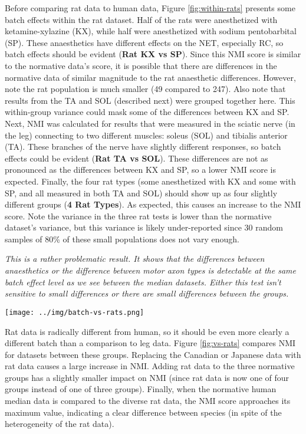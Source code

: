 \documentclass[12pt]{article}
\begin{document}
Before comparing rat data to human data, Figure \ref{fig:within-rats} presents some batch effects within the rat dataset. Half of the rats were anesthetized with ketamine-xylazine (KX), while half were anesthetized with sodium pentobarbital (SP). These anaesthetics have different effects on the NET, especially RC, so batch effects should be evident (\textbf{Rat KX vs SP}). Since this NMI score is similar to the normative data's score, it is possible that there are differences in the normative data of similar magnitude to the rat anaesthetic differences. However, note the rat population is much smaller (49 compared to 247). Also note that results from the TA and SOL (described next) were grouped together here. This within-group variance could mask some of the differences between KX and SP.
Next, NMI was calculated for results that were measured in the sciatic nerve (in the leg) connecting to two different muscles: soleus (SOL) and tibialis anterior (TA). These branches of the nerve have slightly different responses, so batch effects could be evident (\textbf{Rat TA vs SOL}). These differences are not as pronounced as the differences between KX and SP, so a lower NMI score is expected.
Finally, the four rat types (some anesthetized with KX and some with SP, and all measured in both TA and SOL) should show up as four slightly different groups (\textbf{4 Rat Types}). As expected, this causes an increase to the NMI score.
Note the variance in the three rat tests is lower than the normative dataset's variance, but this variance is likely under-reported since 30 random samples of 80\% of these small populations does not vary enough.

\emph{This is a rather problematic result. It shows that the differences between anaesthetics or the difference between motor axon types is detectable at the same batch effect level as we see between the median datasets. Either this test isn't sensitive to small differences or there are small differences between the groups.}

\pagebreak

\begin{figure*}
  \centering
       \texttt{[image: ../img/batch-vs-rats.png]}
         \caption{}
  \label{fig:vs-rats}
\end{figure*}

Rat data is radically different from human, so it should be even more clearly a different batch than a comparison to leg data.  Figure \ref{fig:vs-rats} compares NMI for datasets between these groups. Replacing the Canadian or Japanese data with rat data causes a large increase in NMI. Adding rat data to the three normative groups has a slightly smaller impact on NMI (since rat data is now one of four groups instead of one of three groups). Finally, when the normative human median data is compared to the diverse rat data, the NMI score approaches its maximum value, indicating a clear difference between species (in spite of the heterogeneity of the rat data).
\end{document}
